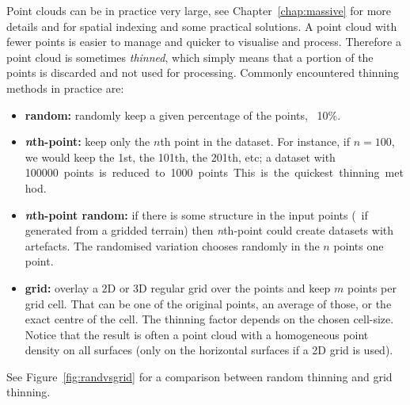 Point clouds can be in practice very large, see Chapter~\ref{chap:massive} for more details and for spatial indexing and some practical solutions.
A point cloud with fewer points is easier to manage and quicker to visualise and process.
Therefore a point cloud is sometimes \emph{thinned}, which simply means that a portion of the points is discarded and not used for processing.
Commonly encountered thinning methods in practice are:
\begin{itemize}
  \item \textbf{random:} randomly keep a given percentage of the points, \eg\ 10\%.
  \item \textbf{\emph{n}th-point:} keep only the $n$th point in the dataset. For instance, if $n=100$, we would keep the 1st, the 101th, the 201th, etc; a dataset with \qty{100000} points is reduced to \qty{1000} points. This is the quickest thinning method.
  \item \textbf{\emph{n}th-point random:} if there is some structure in the input points (\eg\ if generated from a gridded terrain) then \emph{n}th-point could create datasets with artefacts. The randomised variation chooses randomly in the $n$ points one point.
  \item \textbf{grid: }overlay a 2D or 3D regular grid over the points and keep $m$ points per grid cell. That can be one of the original points, an average of those, or the exact centre of the cell. The thinning factor depends on the chosen cell-size. Notice that the result is often a point cloud with a homogeneous point density on all surfaces (only on the horizontal surfaces if a 2D grid is used).
\end{itemize}
See Figure~\ref{fig:randvsgrid} for a comparison between random thinning and grid thinning.
